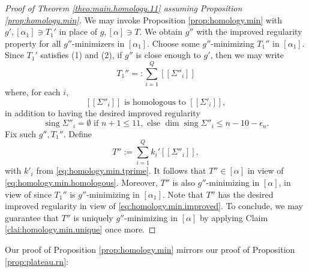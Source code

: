 \documentclass[11pt, letterpaper, reqno]{amsart}
\numberwithin{equation}{section}
\theoremstyle{remark}
\newcommand{\sing}{\operatorname{sing}}
\newcommand{\llbracket}{[\![}
\newcommand{\rrbracket}{]\!]}
\begin{document}
\begin{proof}[Proof of Theorem \ref{theo:main.homology.11} assuming Proposition \ref{prop:homology.min}]
We may invoke Proposition \ref{prop:homology.min} with $g', [\alpha_1] \ni T_1'$ in place of $g, [\alpha] \ni T$. We obtain $g''$ with the improved regularity property for all $g''$-minimizers in $[\alpha_1]$. Choose some $g''$-minimizing $T_1''$ in $[\alpha_1]$. Since $T_1'$ satisfies (1) and (2), if $g''$ is close enough to $g'$, then we may write
\[ T_1'' =: \sum_{i=1}^Q \llbracket \Sigma''_i \rrbracket \]
where, for each $i$,
\begin{equation} \label{eq:homology.min.homologous}
	\llbracket \Sigma''_i \rrbracket \text{ is homologous to } \llbracket \Sigma'_i \rrbracket,
\end{equation}
in addition to having the desired improved regularity
\begin{equation} \label{eq:homology.min.improved}
	\sing \Sigma''_i = \emptyset \text{ if } n+1 \leq 11, \text{ else } \dim \sing \Sigma''_i \leq n-10-\epsilon_n.
\end{equation}
Fix such $g'', T_1''$. Define
\[ T'' := \sum_{i=1}^Q k_i' \llbracket \Sigma''_i \rrbracket, \]
with $k'_i$ from \eqref{eq:homology.min.tprime}. It follows that $T'' \in [\alpha]$ in view of \eqref{eq:homology.min.homologous}. Moreover, $T''$ is also $g''$-minimizing in $[\alpha]$, in view of \cite[Corollary 3]{White:boundary-regularity-multiplicity} since $T_1''$ is $g''$-minimizing in $[\alpha_1]$. Note that $T''$ has the desired improved regularity in view of \eqref{eq:homology.min.improved}. To conclude, we may guarantee that $T''$ is uniquely $g''$-minimizing in $[\alpha]$ by applying Claim \ref{clai:homology.min.unique} once more.
\end{proof}

Our proof of Proposition \ref{prop:homology.min} mirrors our proof of Proposition \ref{prop:plateau.rn}:
\end{document}

